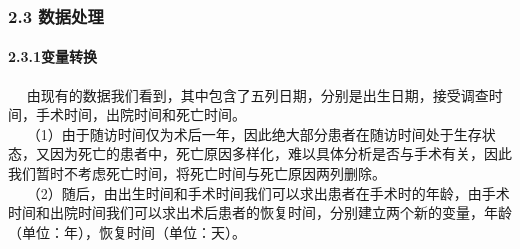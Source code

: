 \documentclass[
]{article}
\begin{document}
\hypertarget{ux6570ux636eux5904ux7406}{%
\subsubsection{2.3 数据处理}\label{ux6570ux636eux5904ux7406}}

\hypertarget{ux53d8ux91cfux8f6cux6362}{%
\paragraph{2.3.1变量转换}\label{ux53d8ux91cfux8f6cux6362}}

 
由现有的数据我们看到，其中包含了五列日期，分别是出生日期，接受调查时间，手术时间，出院时间和死亡时间。\\
 
（1）由于随访时间仅为术后一年，因此绝大部分患者在随访时间处于生存状态，又因为死亡的患者中，死亡原因多样化，难以具体分析是否与手术有关，因此我们暂时不考虑死亡时间，将死亡时间与死亡原因两列删除。\\
 
（2）随后，由出生时间和手术时间我们可以求出患者在手术时的年龄，由手术时间和出院时间我们可以求出术后患者的恢复时间，分别建立两个新的变量，年龄（单位：年），恢复时间（单位：天）。
\end{document}
